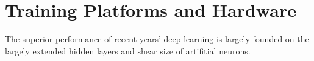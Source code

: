 \section{Training Platforms and Hardware}
The superior performance of recent years' deep learning is largely founded on the largely extended hidden layers and shear size of artifitial neurons. 